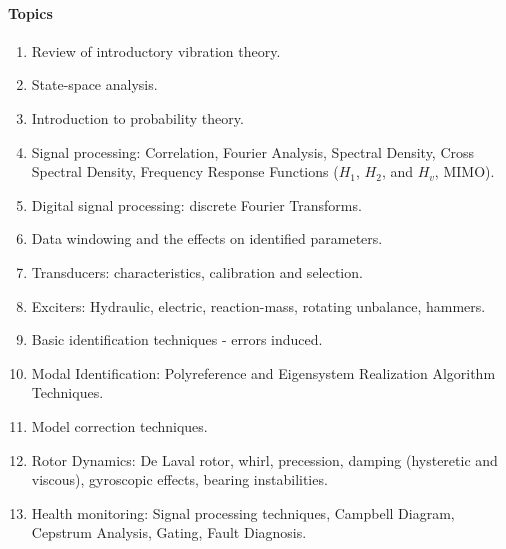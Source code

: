 \documentclass[letterpaper,10pt,english]{sphinxmanual}
\begin{document}
\paragraph{Topics}
\label{\detokenize{classes/ME7690Syll:topics}}\begin{enumerate}
\item {} 
Review of introductory vibration theory.

\item {} 
State-space analysis.

\item {} 
Introduction to probability theory.

\item {} 
Signal processing: Correlation, Fourier Analysis, Spectral Density,
Cross Spectral Density, Frequency Response Functions (\(H_{1}\),
\(H_{2}\), and \(H_{v}\), MIMO).

\item {} 
Digital signal processing: discrete Fourier Transforms.

\item {} 
Data windowing and the effects on identified parameters.

\item {} 
Transducers: characteristics, calibration and selection.

\item {} 
Exciters: Hydraulic, electric, reaction-mass, rotating unbalance,
hammers.

\item {} 
Basic identification techniques - errors induced.

\item {} 
Modal Identification: Polyreference and Eigensystem Realization
Algorithm Techniques.

\item {} 
Model correction techniques.

\item {} 
Rotor Dynamics: De Laval rotor, whirl, precession, damping
(hysteretic and viscous), gyroscopic effects, bearing instabilities.

\item {} 
Health monitoring: Signal processing techniques, Campbell Diagram,
Cepstrum Analysis, Gating, Fault Diagnosis.

\end{enumerate}
\end{document}
